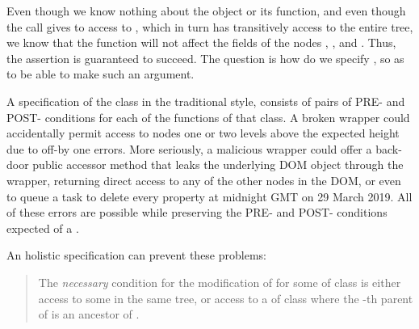 Even though we know nothing about the  object or
its  function, and even though the call gives
to  access to , which in turn has transitively
access to the entire tree, we know that %
the  function will not
affect the  fields of the nodes , ,
and .  Thus, the assertion is guaranteed to
succeed.  The question is how do we specify , so as to be
able to make such an argument. %

A specification of the class  in the traditional
style, \cite{Leavens-etal07} 
consists of pairs of PRE- and POST- conditions for each of the
functions of that class. 
A broken
wrapper could accidentally permit access to nodes one or two levels
above the expected height due to off-by one errors. More seriously,
a malicious wrapper could offer a
back-door public accessor method that leaks the underlying DOM
object through the wrapper, returning direct access to any of the
other nodes in the DOM, or even to queue a task to
delete every property at midnight GMT on 29 March 2019. All of these errors are possible while
preserving the PRE- and POST- conditions expected of a . 

%
%
An holistic specification can prevent these problems:
%
\begin{quote}
The \emph{necessary} condition for the modification of  for some  of class   is either access to some    in the same tree, or  access to a  of class  where the -th parent of  is an ancestor of .
\end{quote}


